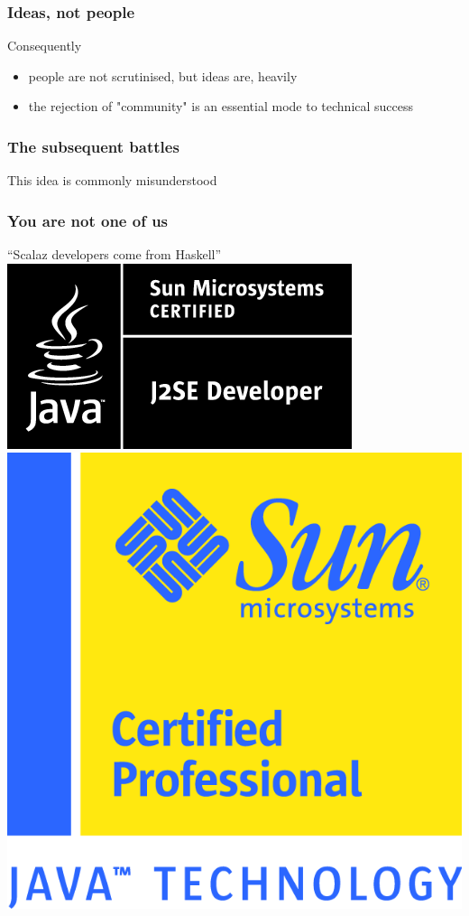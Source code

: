 \begin{frame}
\frametitle{Ideas, not people}
\begin{block}{Consequently}
\begin{itemize}
  \item people are not scrutinised, but ideas are, heavily
  \item the rejection of "community" is an essential mode to technical success
\end{itemize}
\end{block}
\end{frame}


\begin{frame}
\frametitle{The subsequent battles}
\begin{center}
\huge{This idea is commonly misunderstood}\normalsize
\end{center}
\end{frame}


\begin{frame}
\frametitle{You are not one of us}
\begin{block}{``Scalaz developers come from Haskell''}
\vspace{3em}
\includegraphics[width=0.3\paperwidth]{image/JavaCrtfd_Dev_blk.png}
\hspace{3em}
\includegraphics[width=0.2\paperwidth]{image/JavCertDev4c.png}
\end{block}
\end{frame}


